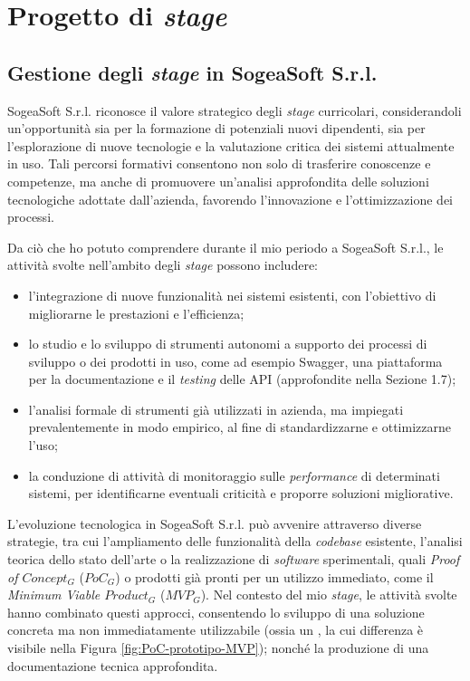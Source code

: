 \chapter{Progetto di \textit{stage}}
    \section{Gestione degli \textit{stage} in SogeaSoft S.r.l.}
    SogeaSoft S.r.l. riconosce il valore strategico degli \textit{stage} curricolari, considerandoli un'opportunità sia per la formazione di potenziali nuovi dipendenti, sia per l'esplorazione di nuove tecnologie e la valutazione critica dei sistemi attualmente in uso. Tali percorsi formativi consentono non solo di trasferire conoscenze e competenze, ma anche di promuovere un'analisi approfondita delle soluzioni tecnologiche adottate dall'azienda, favorendo l'innovazione e l'ottimizzazione dei processi.  

    \vspace{0.2 em}
    \noindent Da ciò che ho potuto comprendere durante il mio periodo a SogeaSoft S.r.l., le attività svolte nell'ambito degli \textit{stage} possono includere: 
    \begin{itemize}
        \item l'integrazione di nuove funzionalità nei sistemi esistenti, con l'obiettivo di migliorarne le prestazioni e l'efficienza;
        \item lo studio e lo sviluppo di strumenti autonomi a supporto dei processi di sviluppo o dei prodotti in uso, come ad esempio Swagger, una piattaforma per la documentazione e il \textit{testing} delle API (approfondite nella Sezione 1.7);  
        \item l'analisi formale di strumenti già utilizzati in azienda, ma impiegati prevalentemente in modo empirico, al fine di standardizzarne e ottimizzarne l’uso;  
        \item la conduzione di attività di monitoraggio sulle \textit{performance} di determinati sistemi, per identificarne eventuali criticità e proporre soluzioni migliorative.  
    \end{itemize}

    \vspace{0.2 em}
    \noindent L'evoluzione tecnologica in SogeaSoft S.r.l. può avvenire attraverso diverse strategie, tra cui l’ampliamento delle funzionalità della \textit{codebase} esistente, l’analisi teorica dello stato dell’arte o la realizzazione di \textit{software} sperimentali, quali \textit{Proof of $Concept_G$} ($PoC_G$) o prodotti già pronti per un utilizzo immediato, come il \textit{Minimum Viable $Product_G$} ($MVP_G$). Nel contesto del mio \textit{stage}, le attività svolte hanno combinato questi approcci, consentendo lo sviluppo di una soluzione concreta ma non immediatamente utilizzabile (ossia un , la cui differenza è visibile nella Figura \ref{fig:PoC-prototipo-MVP}); nonché la produzione di una documentazione tecnica approfondita.  
    
